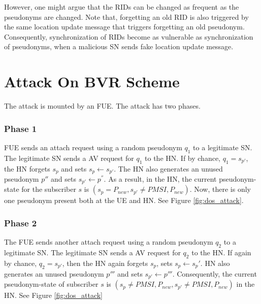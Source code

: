 \documentclass{llncs} %
\begin{document}
However, one might argue that the RIDs can be changed as frequent as the pseudonyms are changed. Note that, forgetting an old RID is also triggered by the same location update message that triggers forgetting an old pseudonym. Consequently, synchronization of RIDs become as vulnerable as synchronization of pseudonyms, when a malicious SN sends fake location update message.

\section{Attack On BVR Scheme} \label{sec:attack}
The attack is mounted by an FUE. The attack has two phases.

\subsubsection{Phase 1} \label{sec:attac_fue_phase1}  FUE sends an attach request using a random pseudonym $q_1$ to a legitimate SN. The legitimate SN sends a AV request for $q_1$ to the HN. If by chance, $q_1 = s_{p'}$, the HN forgets $s_p$ and sets $s_p \leftarrow s_{p'}$. The HN also generates an unused pseudonym ${p''}$ and sets $s_{p'} \leftarrow p^{''}$. As a result, in the HN, the current  pseudonym-state for the subscriber $s$ is $\left(s_{p} = P_{new},s_{p'} \neq PMSI,P_{new}\right)$. Now, there is only one pseudonym present both at the UE and HN. See Figure \ref{fig:dos_attack}.

\subsubsection{Phase 2} \label{sec:attac_fue_phase2} The FUE sends another attach request using a random pseudonym $q_2$ to a legitimate SN. The legitimate SN sends a AV request for $q_2$ to the HN. If again by chance, $q_2 = s_{p'}$, then the HN again forgets $s_{p}$, sets $s_p \leftarrow s_p'$. HN also generates an unused pseudonym $p'''$ and sets $s_{p'} \leftarrow p'''$. Consequently, the current pseudonym-state of subscriber $s$ is $\left(s_{p} \neq PMSI,P_{new},s_{p'} \neq PMSI,P_{new}\right)$ in the HN. See Figure \ref{fig:dos_attack}
\end{document}
